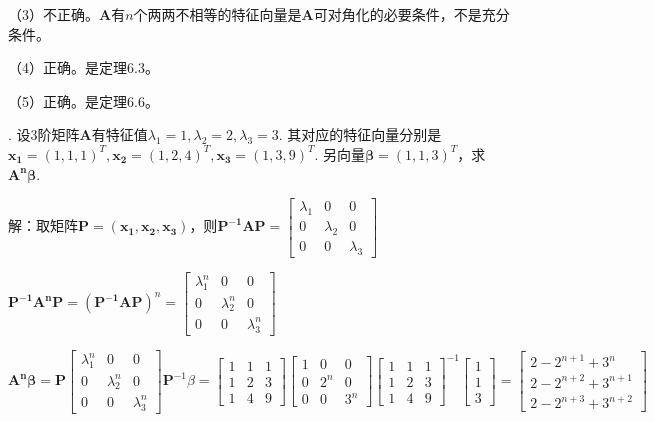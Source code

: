 \documentclass[10pt,twocolumn,letterpaper]{article}
\theoremstyle{mythmstyle}
\begin{document}
（3）不正确。$\bm{A}$有$n$个两两不相等的特征向量是$\bm{A}$可对角化的必要条件，不是充分条件。

（4）正确。是定理6.3。

（5）正确。是定理6.6。

\vspace{1em}
. 设3阶矩阵$\bm{A}$有特征值$\lambda_1 = 1, \lambda_2 = 2, \lambda_3 = 3$. 其对应的特征向量分别是$\bm{x_1} = (1, 1, 1)^T, \bm{x_2} = (1, 2, 4)^T, \bm{x_3} = (1, 3, 9)^T$. 另向量$\bm{\beta} = (1, 1, 3)^T$，求$\bm{A^n\beta}$.

\noindent 解：取矩阵$\bm{P} = (\bm{x_1}, \bm{x_2}, \bm{x_3})$，则$\bm{P^{-1}AP}= \begin{bmatrix}
\lambda_1 & 0 & 0 \\
0 & \lambda_2 & 0 \\
0 & 0 & \lambda_3
\end{bmatrix}$

\begin{center}
    $\bm{P^{-1}A^nP} = (\bm{P^{-1}AP})^n = \begin{bmatrix}
    \lambda_1^n & 0 & 0 \\
    0 & \lambda_2^n & 0 \\
    0 & 0 & \lambda_3^n
    \end{bmatrix}$
\end{center}

\begin{center}
    $\bm{A^n\beta} = \bm{P}\begin{bmatrix}
    \lambda_1^n & 0 & 0 \\
    0 & \lambda_2^n & 0 \\
    0 & 0 & \lambda_3^n
    \end{bmatrix}\bm{P}^{-1}\beta
    = \begin{bmatrix}
    1 & 1 & 1 \\
    1 & 2 & 3 \\
    1 & 4 & 9
    \end{bmatrix}
    \begin{bmatrix}
    1 & 0 & 0 \\
    0 & 2^n & 0 \\
    0 & 0 & 3^n
    \end{bmatrix}
    \begin{bmatrix}
    1 & 1 & 1 \\
    1 & 2 & 3 \\
    1 & 4 & 9
    \end{bmatrix}^{-1}
    \begin{bmatrix}
    1 \\ 1 \\ 3
    \end{bmatrix} = 
    \begin{bmatrix}
    2-2^{n+1}+3^n \\ 2-2^{n+2}+3^{n+1} \\ 2-2^{n+3}+3^{n+2}
    \end{bmatrix}$
\end{center}
\end{document}
